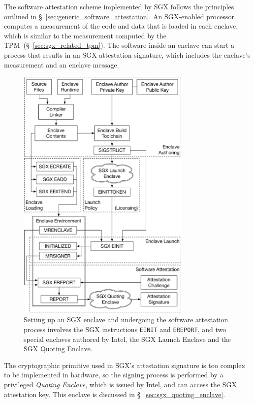 \label{sec:sgx_attestation}

The software attestation scheme implemented by SGX follows the principles
outlined in \S~\ref{sec:generic_software_attestation}. An SGX-enabled processor
computes a measurement of the code and data that is loaded in each enclave,
which is similar to the measurement computed by the
TPM~(\S~\ref{sec:sgx_related_tpm}). The software inside an enclave can start a
process that results in an SGX attestation signature, which includes the
enclave's measurement and an enclave message.

\begin{figure}[hbt]
  \centering
  \includegraphics[width=85mm]{figures/sgx_attestation_overview.pdf}
  \caption{
    Setting up an SGX enclave and undergoing the software attestation process
    involves the SGX instructions \texttt{EINIT} and \texttt{EREPORT}, and two
    special enclaves authored by Intel, the SGX Launch Enclave and the SGX
    Quoting Enclave.
  }
  \label{fig:sgx_attestation_overview}
\end{figure}


The cryptographic primitive used in SGX's attestation signature is too complex
to be implemented in hardware, so the signing process is performed by a
privileged \textit{Quoting Enclave}, which is issued by Intel, and can access
the SGX attestation key. This enclave is discussed in
\S~\ref{sec:sgx_quoting_enclave}.

